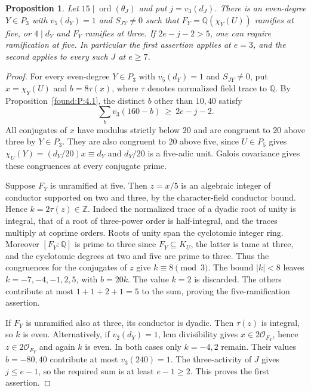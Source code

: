 \documentclass[11pt,a4paper]{article}
\numberwithin{equation}{section}
\newtheorem{proposition}[theorem]{Proposition}
\theoremstyle{remark}
\newcommand{\ZZ}{\mathbb Z}
\newcommand{\QQ}{\mathbb Q}
\begin{document}
\begin{proposition}\label{found:D:5.1}
Let $15\mid\operatorname{ord}(\theta_J)$ and put $j=v_3(d_J)$.
There is an even-degree $Y\in P_3$ with $v_5(d_Y)=1$ and $S_{JY}\ne0$
such that $F_Y=\QQ(\chi_Y(U))$ ramifies at five, or $4\mid d_Y$ and
$F_Y$ ramifies at three. If $2e-j-2>5$, one can require ramification at
five. In particular the first assertion applies at $e=3$, and the second
applies to every such $J$ at $e\ge7$.
\end{proposition}

\begin{proof}
For every even-degree $Y\in P_3$ with $v_5(d_Y)=1$ and $S_{JY}\ne0$,
put $x=\chi_Y(U)$ and $b=8\tau(x)$, where $\tau$ denotes normalized
field trace to $\QQ$. By Proposition~\ref{found:P:4.1}, the distinct $b$ other
than $10,40$ satisfy
\[
   \sum_b v_3(160-b)\ \ge\ 2e-j-2.
\]
All conjugates of $x$ have modulus strictly below $20$ and are congruent
to $20$ above three by $Y\in P_3$. They are also congruent to $20$ above
five, since $U\in P_5$ gives $\chi_U(Y)=(d_Y/20)x\equiv d_Y$ and
$d_Y/20$ is a five-adic unit. Galois covariance gives these congruences
at every conjugate prime.

Suppose $F_Y$ is unramified at five. Then $z=x/5$ is an algebraic
integer of conductor supported on two and three, by the character-field
conductor bound. Hence $k=2\tau(z)\in\ZZ$. Indeed the normalized trace of
a dyadic root of unity is integral, that of a root of three-power order
is half-integral, and the traces multiply at coprime orders. Roots of
unity span the cyclotomic integer ring. Moreover $[F_Y:\QQ]$ is prime to
three since $F_Y\subseteq K_U$, the latter is tame at three, and the
cyclotomic degrees at two and five are prime to three. Thus the
congruences for the conjugates of $z$ give $k\equiv8\pmod3$. The bound
$|k|<8$ leaves $k=-7,-4,-1,2,5$, with $b=20k$. The value $k=2$ is
discarded. The others contribute at most $1+1+2+1=5$ to the sum,
proving the five-ramification assertion.

If $F_Y$ is unramified also at three, its conductor is dyadic. Then
$\tau(z)$ is integral, so $k$ is even. Alternatively, if $v_2(d_Y)=1$,
lcm divisibility gives $x\in2\mathcal O_{F_Y}$, hence
$z\in2\mathcal O_{F_Y}$ and again $k$ is even. In both cases only
$k=-4,2$ remain. Their values $b=-80,40$ contribute at most
$v_3(240)=1$. The three-activity of $J$ gives $j\le e-1$, so the
required sum is at least $e-1\ge2$. This proves the first assertion.
\end{proof}
\end{document}
